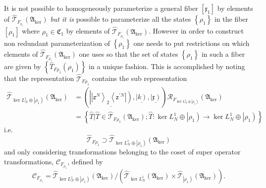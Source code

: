 \documentclass[aps,preprint]{revtex4}%
\begin{document}
It is not possible to homogeneously parameterize a general fiber $\left[
\mathfrak{x}_{1}\right]  $ by elements of $\mathcal{\hat{T}}_{F_{\mathfrak{x}%
_{1}}}\left(  \mathfrak{A}_{\ker}\right)  $ \cite{weiner2003} \emph{but it is
}possible to parameterize all the states $\left\{  \rho_{1}\right\}  $ in the
fiber $\left[  \rho_{1}\right]  $ where $\rho_{1}\in\mathfrak{C}_{1}$ by
elements of $\mathcal{\hat{T}}_{F_{\rho_{1}}}\left(  \mathfrak{A}_{\ker
}\right)  $. However in order to construct non redundant parameterization of
$\left\{  \rho_{1}\right\}  $ one needs to put restrictions on which elements
of $\mathcal{\hat{T}}_{F_{\rho_{1}}}\left(  \mathfrak{A}_{\ker}\right)  $ one
uses so that the set of states $\left\{  \rho_{1}\right\}  $ in such a fiber
are given by $\left\{  \hat{T}_{F\rho_{1}}\left(  \rho_{1}\right)  \right\}  $
in a unique fashion. This is accomplished by noting that the representation
$\mathcal{\hat{T}}_{F\rho_{1}}$ contains the sub representation
\begin{align}
\mathcal{\hat{T}}_{\ker L_{N}^{1}\oplus\left\vert \mathfrak{\rho}_{1}\right)
}\left(  \mathfrak{A}_{\ker}\right)   &  =\left(  \underline{\left\vert
\left\vert \mathsf{z}^{N}\right\rangle _{2}\left\langle \mathsf{z}^{\prime
N}\right\vert \right)  },\underline{\left\vert k\right)  },\underline
{\left\vert \mathfrak{x}\right)  }\right)  \mathcal{R}_{F_{\ker L_{N}%
^{1}\oplus\left\vert \mathfrak{\rho}_{1}\right)  }}\left(  \mathfrak{A}_{\ker
}\right) \nonumber\\
&  =\left\{  \hat{T}|\hat{T}\in\mathcal{\hat{T}}_{F\rho_{1}}\left(
\mathfrak{A}_{\ker}\right)  ;\hat{T}:\ker L_{N}^{1}\oplus\left\vert
\mathfrak{\rho}_{1}\right)  \rightarrow\ker L_{N}^{1}\oplus\left\vert
\mathfrak{\rho}_{1}\right)  \right\}
\end{align}
i.e.%
\begin{equation}
\mathcal{\hat{T}}_{F\rho_{1}}\supset\mathcal{\hat{T}}_{\ker L_{N}^{1}%
\oplus\left\vert \mathfrak{\rho}_{1}\right)  }\left(  \mathfrak{A}_{\ker
}\right)
\end{equation}
and only considering transformations belonging to the coset of super operator
transformations, $\mathcal{C}_{F_{\rho_{1}}}$, defined by
\begin{equation}
\mathcal{C}_{F_{\rho_{1}}}=\mathcal{\hat{T}}_{\ker L_{N}^{1}\oplus\left\vert
\mathfrak{\rho}_{1}\right)  }\left(  \mathfrak{A}_{\ker}\right)  /\left(
\mathcal{\hat{T}}_{\ker L_{N}^{1}}\left(  \mathfrak{A}_{\ker}\right)
\times\mathcal{\hat{T}}_{\left\vert \mathfrak{\rho}_{1}\right)  }\left(
\mathfrak{A}_{\ker}\right)  \right)  .
\end{equation}
\end{document}
